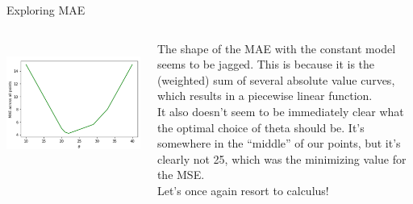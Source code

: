 \documentclass[aspectratio=169]{../latex_main/tntbeamer}  %
\begin{document}
	
	\begin{frame}{Exploring MAE}
	    \begin{columns}
	        \begin{column}{.5\textwidth}
	                \\
	                \includegraphics[scale=.4]{Bild37}
	        \end{column}
	        
	        
	        \begin{column}{.5\textwidth}
	                The shape of the MAE with the constant model seems to be jagged. This is because it is the (weighted) sum of several absolute value curves, which results in a piecewise linear function. \\
                    It also doesn’t seem to be immediately clear what the optimal choice of theta should be. It’s somewhere in the “middle” of our points, but it’s clearly not 25, which was the minimizing value for the MSE. \\
                    Let’s once again resort to calculus!
	        \end{column}
	    \end{columns}
	\end{frame}
	
\end{document}
